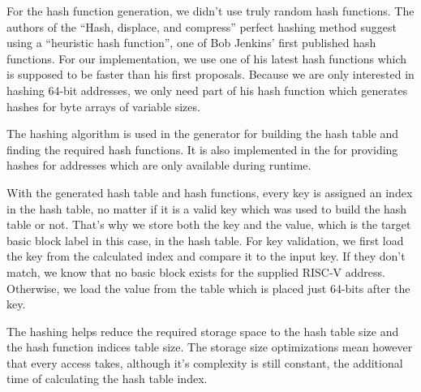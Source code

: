 \documentclass[course=eragp]{aspdoc}
\begin{document}
\begin{enumerate}
          For the hash function generation, we didn't use truly random hash functions. The authors of the ``Hash,
          displace, and compress'' perfect hashing method suggest using a ``heuristic hash
          function''\cite{CHD}, one of Bob Jenkins' first published hash functions.\cite{jenkins_hash_1} For
          our implementation, we use one of his latest hash functions which is supposed to be faster than his
          first proposals.\cite{jenkins_hash_2} Because we are only interested in hashing 64-bit addresses, we
          only need part of his hash function which generates hashes for byte arrays of variable sizes.

          \par

          The hashing algorithm is used in the generator for building the hash table and finding the required
          hash functions. It is also implemented in the  for providing hashes for addresses
          which are only available during runtime.

          \par

          With the generated hash table and hash functions, every key is assigned an index in the hash table,
          no matter if it is a valid key which was used to build the hash table or not. That's why we store
          both the key and the value, which is the target basic block label in this case, in the hash table.
          For key validation, we first load the key from the calculated index and compare it to the input key.
          If they don't match, we know that no basic block exists for the supplied RISC-V address. Otherwise,
          we load the value from the table which is placed just 64-bits after the key.

          \par

          The hashing helps reduce the required storage space to the hash table size and the hash function
          indices table size. The storage size optimizations mean however that
          every access takes, although it's complexity is still constant, the additional time of calculating
          the hash table index.

\end{enumerate}
\end{document}
